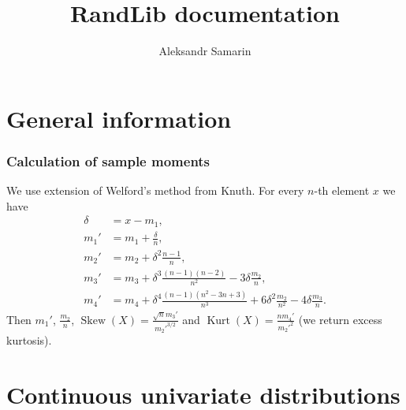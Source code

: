 \documentclass[a4paper,11pt]{article}
\title{RandLib documentation}
\author{Aleksandr Samarin}
\theoremstyle{plain}
\theoremstyle{definition}
\begin{document}
	
	\maketitle
	\tableofcontents
	
	\part{General information}
	\section{Calculation of sample moments}
	We use extension of Welford's method from Knuth. For every $n$-th element $x$ we have
	\[
	\begin{aligned}
	\delta &= x - m_1, \\
	m_1' &= m_1 +  \frac{\delta}{n}, \\
	m_2' &= m_2 +  \delta^2 \frac{n-1}{n}, \\
	m_3' &= m_3 + \delta^3 \frac{(n-1)(n-2)}{n^2} - 3\delta \frac{m_2}{n}, \\
	m_4' &= m_4 +  \delta^4 \frac{(n-1)(n^2-3n+3)}{n^3}+6\delta^2 \frac{m_2}{n^2}-4\delta\frac{m_3}{n}.
	\end{aligned}
	\]
	Then $ m_1'$, $\frac{m_2}{n}$, $\operatorname{Skew}(X) = \frac{\sqrt{n}m_3'}{m_2'^{3/2}}$ and $\operatorname{Kurt}(X) = \frac{nm_4'}{m_2'^2}$ (we return excess kurtosis). 
	
	\pagebreak
	\part{Continuous univariate distributions}
\end{document}
